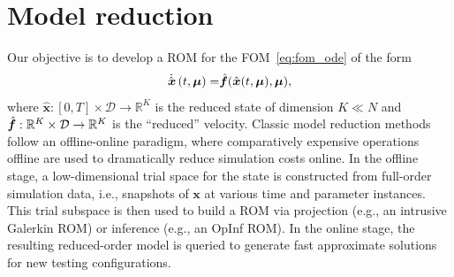\documentclass[3p,computermodern,11pt]{elsarticle}
\numberwithin{equation}{section}
\newcommand{\reducedState}{\hat{\state}}
\newcommand{\reducedStateCoDomain}{\RR{\romDim}}
\newcommand{\reducedVelocity}{\skew{4}\hat{\velocity}}
\newcommand{\state}{\boldsymbol x}
\newcommand{\velocity}{\boldsymbol f}
\newcommand{\params}{\boldsymbol \mu}
\newcommand{\paramDomain}{\mathcal{D}}
\newcommand{\timeDomain}{[0,T]}
\newcommand{\RR}[1]{\mathbb{R}^{#1}}
\newcommand{\romDim}{K}
\begin{document}
% 
\section{Model reduction}\label{sec:modelreduction}
Our objective is to develop a ROM for the FOM~\eqref{eq:fom_ode} of the form
\begin{equation}\label{eq:rom_ode}
\begin{split}
\dot{\reducedState}\left(t,\params \right) =& \reducedVelocity(\reducedState(t,\params),\params),\\
\end{split}
\end{equation}
where $\reducedState: \timeDomain \times \paramDomain \rightarrow \reducedStateCoDomain$ is the reduced state of dimension $K\ll N$ and $\reducedVelocity: \RR{\romDim} \times \paramDomain  \rightarrow \RR{\romDim}$ is the ``reduced'' velocity.
Classic model reduction methods follow an offline-online paradigm, where comparatively expensive operations offline are used to dramatically reduce simulation costs online. In the offline stage, a low-dimensional trial space for the state is constructed from full-order simulation data, i.e., snapshots of $\state$ at various time and parameter instances. This trial subspace is then used to build a ROM via projection (e.g., an intrusive Galerkin ROM) or inference (e.g., an OpInf ROM). In the online stage, the resulting reduced-order model is queried to generate fast approximate solutions for new testing configurations.
\end{document}
